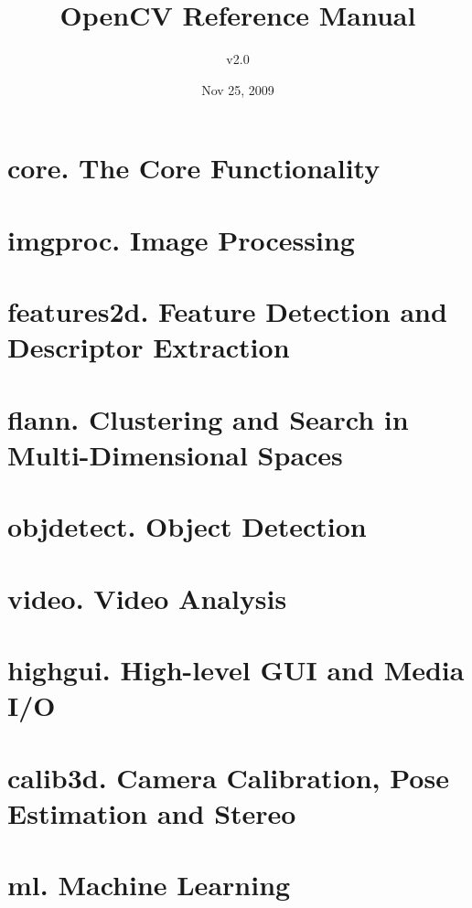 \documentclass[11pt]{book}
\title{OpenCV Reference Manual}		%
\author{v2.0}		                %
\date{Nov 25, 2009}				%
\begin{document}
\maketitle					%

\setcounter{tocdepth}{8}
\tableofcontents



\chapter{core. The Core Functionality}









\chapter{imgproc. Image Processing}









\chapter{features2d. Feature Detection and Descriptor Extraction}

%
%

\chapter{flann. Clustering and Search in Multi-Dimensional Spaces}


\chapter{objdetect. Object Detection}


\chapter{video. Video Analysis}


\chapter{highgui. High-level GUI and Media I/O}

\ifPy     %
\else

\fi

\chapter{calib3d. Camera Calibration, Pose Estimation and Stereo}



\chapter{ml. Machine Learning}

\end{document}
